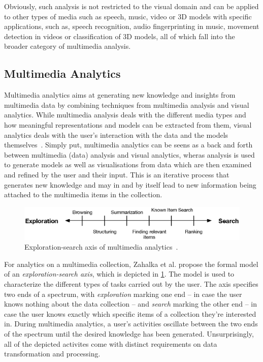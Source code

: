 Obviously, such analysis is not restricted to the visual domain and can be applied to other types of media such as speech, music, video or 3D models with specific applications, such as, speech recognition, audio fingerprinting in music, movement detection in videos or classification of 3D models, all of which fall into the broader category of multimedia analysis.

\subsection{Multimedia Analytics}

Multimedia analytics aims at generating new knowledge and insights from multimedia data by combining techniques from multimedia analysis and visual analytics. While multimedia analysis deals with the different media types and how meaningful representations and models can be extracted from them, visual analytics deals with the user's interaction with the data and the models themselves~\cite{Chinchor:2010multimedia,Keim:2010mastering}. Simply put, multimedia analytics can be seens as a back and forth between multimedia (data) analysis and visual analytics, wheras analysis is used to generate models as well as visualisations from data which are then examined and refined by the user and their input. This is an iterative process that generates new knowledge and may in and by itself lead to new information being attached to the multimedia items in the collection.

\begin{figure}[h]
    \centering
    \includegraphics[width=\textwidth]{figures/exploration_search_axis.eps}
    \caption{Exploration-search axis of multimedia analytics~\cite{Zahalka:2014towards}.}
    \label{figure:exploration-search-axis}
\end{figure}

For analytics on a multimedia collection, Zahalka et al. \cite{Zahalka:2014towards} propose the formal model of an \emph{exploration-search axis}, which is depicted in \cref{figure:exploration-search-axis}. The model is used to characterize the different types of tasks carried out by the user. The axis specifies two ends of a spectrum, with \emph{exploration} marking one end -- in case the user knows nothing about the data collection -- and \emph{search} marking the other end -- in case the user knows exactly which specific items of a collection they're interested in. During multimedia analytics, a user's activities oscillate between the two ends of the spectrum until the desired knowledge has been generated. Unsurprisingly, all of the depicted activites come with distinct requirements on data transformation and processing.

